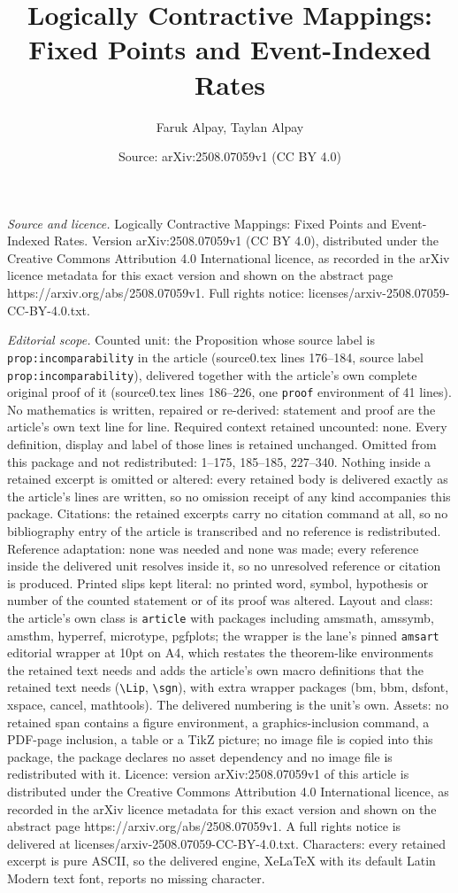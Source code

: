 \documentclass[10pt,a4paper]{amsart}
\title[Logically Contractive Mappings: Fixed Points and Event-Index]{Logically Contractive Mappings: Fixed Points and Event-Indexed Rates}
\author{Faruk Alpay, Taylan Alpay}
\date{Source: arXiv:2508.07059v1 (CC BY 4.0)}
\begin{document}
\maketitle

\noindent\emph{Source and licence.} Logically Contractive Mappings: Fixed Points and Event-Indexed Rates. Version arXiv:2508.07059v1 (CC BY 4.0), distributed under the Creative Commons Attribution 4.0 International licence, as recorded in the arXiv licence metadata for this exact version and shown on the abstract page https://arxiv.org/abs/2508.07059v1. Full rights notice: licenses/arxiv-2508.07059-CC-BY-4.0.txt.\par\smallskip

\noindent\textit{Editorial scope.} Counted unit: the Proposition whose source label is \texttt{prop:incomparability} in the article (source0.tex lines 176--184, source label \texttt{prop:incomparability}), delivered together with the article's own complete original proof of it (source0.tex lines 186--226, one \texttt{proof} environment of 41 lines). No mathematics is written, repaired or re-derived: statement and proof are the article's own text line for line. Required context retained uncounted: none. Every definition, display and label of those lines is retained unchanged. Omitted from this package and not redistributed: 1--175, 185--185, 227--340. Nothing inside a retained excerpt is omitted or altered: every retained body is delivered exactly as the article's lines are written, so no omission receipt of any kind accompanies this package. Citations: the retained excerpts carry no citation command at all, so no bibliography entry of the article is transcribed and no reference is redistributed. Reference adaptation: none was needed and none was made; every reference inside the delivered unit resolves inside it, so no unresolved reference or citation is produced. Printed slips kept literal: no printed word, symbol, hypothesis or number of the counted statement or of its proof was altered. Layout and class: the article's own class is \texttt{article} with packages including amsmath, amssymb, amsthm, hyperref, microtype, pgfplots; the wrapper is the lane's pinned \texttt{amsart} editorial wrapper at 10pt on A4, which restates the theorem-like environments the retained text needs and adds the article's own macro definitions that the retained text needs (\texttt{\textbackslash Lip}, \texttt{\textbackslash sgn}), with extra wrapper packages (bm, bbm, dsfont, xspace, cancel, mathtools). The delivered numbering is the unit's own. Assets: no retained span contains a figure environment, a graphics-inclusion command, a PDF-page inclusion, a table or a TikZ picture; no image file is copied into this package, the package declares no asset dependency and no image file is redistributed with it. Licence: version arXiv:2508.07059v1 of this article is distributed under the Creative Commons Attribution 4.0 International licence, as recorded in the arXiv licence metadata for this exact version and shown on the abstract page https://arxiv.org/abs/2508.07059v1. A full rights notice is delivered at licenses/arxiv-2508.07059-CC-BY-4.0.txt. Characters: every retained excerpt is pure ASCII, so the delivered engine, XeLaTeX with its default Latin Modern text font, reports no missing character.
\end{document}
